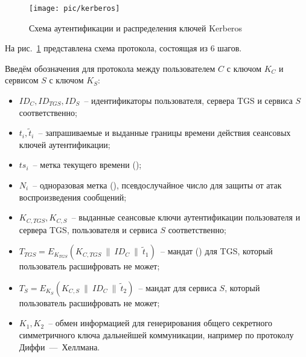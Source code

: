\begin{figure}[!ht]
	\centering
	\texttt{[image: pic/kerberos]}
	\caption{Схема аутентификации и распределения ключей Kerberos\label{fig:kerberos}}
\end{figure}

На рис.~\ref{fig:kerberos} представлена схема протокола, состоящая из 6 шагов.

Введём обозначения для протокола между пользователем $C$ с ключом $K_C$ и сервисом $S$ с ключом $K_S$:
\begin{itemize}
    \item $ID_C, ID_{TGS}, ID_S$~-- идентификаторы пользователя, сервера TGS и сервиса $S$ соответственно;
    \item $t_i, \tilde{t}_i$~-- запрашиваемые и выданные границы времени действия сеансовых ключей аутентификации;
    \item $ts_i$~-- метка текущего времени ();
    \item $N_i$~-- одноразовая метка (), псевдослучайное число для защиты от атак воспроизведения сообщений;
    \item $K_{C,TGS}, K_{C,S}$~-- выданные сеансовые ключи аутентификации пользователя и сервера TGS, пользователя и сервиса $S$ соответственно;
    \item $T_{TGS} = E_{K_{TGS}}(K_{C,TGS} ~\|~ ID_C ~\|~ \tilde{t}_1)$~-- мандат () для TGS, который пользователь расшифровать не может;
    \item $T_{S} = E_{K_S}(K_{C,S} ~\|~ ID_C ~\|~ \tilde{t}_2)$~-- мандат для сервиса $S$, который пользователь расшифровать не может;
    \item $K_1, K_2$~-- обмен информацией для генерирования общего секретного симметричного ключа дальнейшей коммуникации, например по протоколу Диффи~---~Хеллмана.
\end{itemize}

